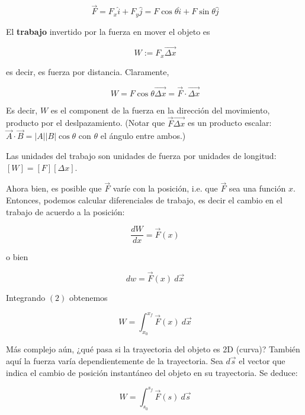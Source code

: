 \documentclass[12pt]{article}
\theoremstyle{definition}
\begin{document}
\begin{equation*}
    \vec{F} = F_x \hat{i} + F_y \hat{j} = F \cos \theta \hat{i} + F \sin \theta
    \hat{j}
\end{equation*}

El \textbf{trabajo} invertido por la fuerza en mover el objeto es 

\begin{equation}
    W := F_x \vec{\Delta x}
\end{equation}

es decir, es fuerza por distancia. Claramente, 

\begin{equation*}
    W = F \cos \theta \vec{\Delta x} = \vec{F} \cdot \vec{\Delta x}
\end{equation*}

Es decir, $W$ es el component de la fuerza en la dirección del movimiento,
producto por el deslpazamiento. (Notar que $\vec{F} \vec{\Delta x}$ es un
producto escalar: $\vec{A} \cdot \vec{B} = \left| A \right|\left| B \right| \cos
\theta$ con $\theta$ el ángulo entre ambos.)

Las unidades del trabajo son unidades de fuerza por unidades de longitud: 
$\left[ W \right] = \left[ F \right] \left[ \Delta x \right] $.

Ahora bien, es posible que $\vec{F}$ varíe con la posición, i.e. que $\vec{F}$
sea una función $x$. Entonces, podemos calcular diferenciales de trabajo, es
decir el cambio en el trabajo de acuerdo a la posición:

\begin{equation*}
    \frac{dW}{dx} = \vec{F}(x)
\end{equation*}

o bien

\begin{equation}
    dw = \vec{F}(x) ~ d\vec{x}
\end{equation}

Integrando $(2)$ obtenemos 

\begin{equation}
    W = \int_{x_0}^{x_f} \vec{F}(x) ~ d\vec{x}
\end{equation}

Más complejo aún, ¿qué pasa si la trayectoria del objeto es 2D (curva)? También
aquí la fuerza varía dependientemente de la trayectoria. Sea $d\vec{s}$ el
vector que indica el cambio de posición instantáneo del objeto en su
trayectoria. Se deduce: 

\begin{equation}
    W = \int_{s_0}^{s_f} \vec{F}(s) ~ d\vec{s}
\end{equation}
\end{document}
